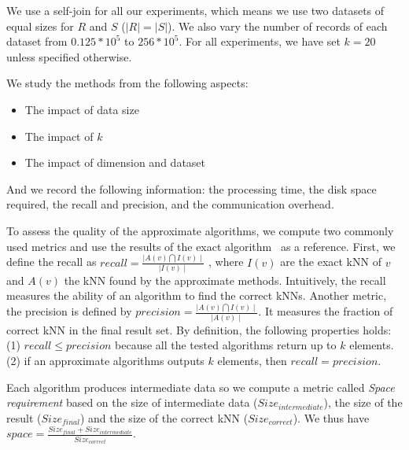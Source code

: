 We use a self-join for all our experiments, which means we use two datasets of equal sizes for $R$ and $S$ 
($|R|=|S|$). We also vary the number of 
records of each dataset from $0.125*10^5$ to $256*10^5$.
For all experiments, we have set $k=20$ unless specified otherwise. 

We study the methods from the following aspects:
\begin{itemize}

\item The impact of data size

\item The impact of $k$

\item The impact of dimension and dataset

\end{itemize}

And we record the following information: the processing time, the disk space required, the recall and precision, and the communication overhead.

To assess the quality of the approximate algorithms, we compute two commonly used metrics and use the results of 
the exact algorithm \VO~as a reference. First, we define the recall as $ recall = \frac{\mid A(v) \bigcap I(v) 
\mid}{\mid  
I(v) \mid}$%
, where  $I(v)$ are the exact kNN of $v$ and $A(v)$ the kNN found 
by the approximate methods. Intuitively, the recall measures the ability of an algorithm to find the correct kNNs.
Another metric, the precision is defined by $precision =  \frac{\mid A(v) \bigcap I(v) \mid}{\mid  
A(v) \mid}$. It measures the fraction of correct kNN in the
final result set. By definition, the following properties holds: (1) $recall \leq precision$ because all the tested 
algorithms return up to $k$ elements. (2) if an approximate algorithms outputs $k$ elements, 
then  $ recall = precision$. 

Each algorithm produces intermediate data so we compute a metric called \emph{Space requirement} based on the size of
intermediate data ($Size_{intermediate}$), the size of the result ($Size_{final}$) and the size of the correct kNN 
($Size_{correct}$). We thus have $space = \frac{Size_{final}+Size_{intermediate}}{Size_{correct}}$.


